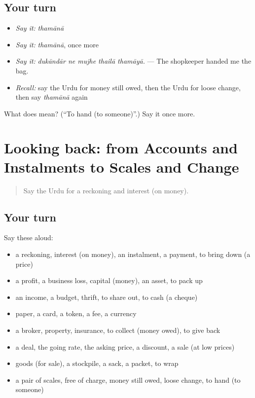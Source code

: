 \subsection*{Your turn}
\begin{itemize}
\raggedright
  \item \emph{Say it:} \emph{thamānā}
  \item \emph{Say it:} \emph{thamānā}, once more
  \item \emph{Say it:} \emph{dukāndār ne mujhe thailā thamāyā.} — The shopkeeper handed me the bag.
  \item \emph{Recall:} say the Urdu for money still owed, then the Urdu for loose change, then say \emph{thamānā} again
\end{itemize}

\begin{tcolorbox}[breakable,colback=teal!4,colframe=teal!35!black,title={Before you move on}]
What does  mean? (\textquotedblleft{}To hand (to someone)\textquotedblright{}.) Say it once more.
\end{tcolorbox}
\section[(dialogue)]{Looking back: from Accounts and Instalments to Scales and Change}

\label{lesson:UR-R425-review-418-425}



\begin{quote}
Say the Urdu for a reckoning and interest (on money).
\end{quote}

\subsection*{Your turn}
Say these aloud:

\begin{itemize}
\raggedright
  \item a reckoning, interest (on money), an instalment, a payment, to bring down (a price)
  \item a profit, a business loss, capital (money), an asset, to pack up
  \item an income, a budget, thrift, to share out, to cash (a cheque)
  \item paper, a card, a token, a fee, a currency
  \item a broker, property, insurance, to collect (money owed), to give back
  \item a deal, the going rate, the asking price, a discount, a sale (at low prices)
  \item goods (for sale), a stockpile, a sack, a packet, to wrap
  \item a pair of scales, free of charge, money still owed, loose change, to hand (to someone)
\end{itemize}

